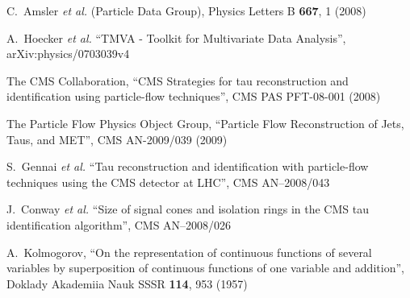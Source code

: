 \begin{thebibliography}{9}

  C.~Amsler {\it et al.} (Particle Data Group), Physics Letters B {\bf 667}, 1 (2008)

   A.~Hoecker {\it et al.} ``TMVA - Toolkit for Multivariate Data Analysis'', arXiv:physics/0703039v4 

   The CMS Collaboration, ``CMS Strategies for tau reconstruction and
   identification using particle-flow techniques'', CMS PAS PFT-08-001 (2008)

   The Particle Flow Physics Object Group, ``Particle Flow Reconstruction of
   Jets, Taus, and MET'', CMS AN-2009/039 (2009)

  S.~Gennai {\it et al.} ``Tau reconstruction and identification with particle-flow techniques using the CMS detector at LHC'', 
  CMS AN--2008/043

   J.~Conway {\it et al.} ``Size of signal cones and isolation rings in the CMS
   tau identification algorithm'', CMS AN--2008/026

   A.~Kolmogorov, ``On the representation of continuous functions of several variables by superposition of continuous functions of one variable and addition'',
   Doklady Akademiia Nauk SSSR {\bf 114}, 953 (1957)

\end{thebibliography}
      
